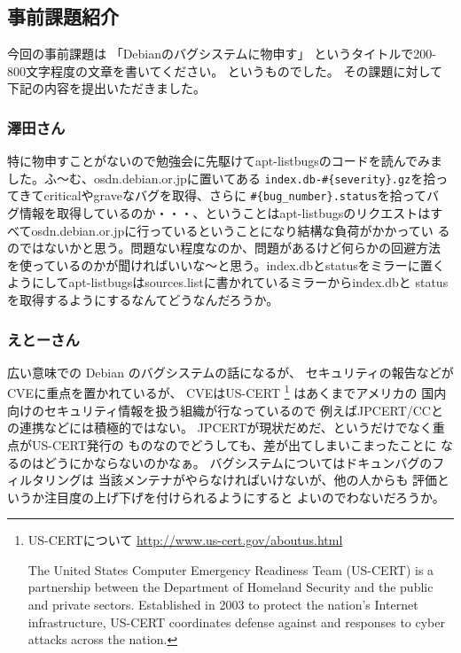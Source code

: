\documentclass[mingoth,a4paper]{jsarticle}
\begin{document}
\subsection{事前課題紹介}


今回の事前課題は
「Debianのバグシステムに物申す」
というタイトルで200-800文字程度の文章を書いてください。
というものでした。
その課題に対して下記の内容を提出いただきました。

\subsubsection{澤田さん}

特に物申すことがないので勉強会に先駆けてapt-listbugsのコードを読んでみま
した。ふ〜む、osdn.debian.or.jpに置いてある
\verb!index.db-#{severity}.gz!を拾っ
てきてcriticalやgraveなバグを取得、さらに
\verb!#{bug_number}.status!を拾ってバ
グ情報を取得しているのか・・・、ということはapt-listbugsのリクエストはす
べてosdn.debian.or.jpに行っているということになり結構な負荷がかかってい
るのではないかと思う。問題ない程度なのか、問題があるけど何らかの回避方法
を使っているのかが聞ければいいな〜と思う。index.dbとstatusをミラーに置く
ようにしてapt-listbugsはsources.listに書かれているミラーからindex.dbと
statusを取得するようにするなんてどうなんだろうか。

\subsubsection{えとーさん}

広い意味での Debian のバグシステムの話になるが、
セキュリティの報告などがCVEに重点を置かれているが、
CVEはUS-CERT
\footnote{
US-CERTについて
\url{http://www.us-cert.gov/aboutus.html}

The United States Computer Emergency Readiness Team (US-CERT) 
is a partnership between the Department of Homeland Security 
and the public and private sectors. Established in 2003 to protect 
the nation's Internet infrastructure, US-CERT coordinates defense against 
and responses to cyber attacks across the nation.
}
はあくまでアメリカの
国内向けのセキュリティ情報を扱う組織が行なっているので
例えばJPCERT/CCとの連携などには積極的ではない。
JPCERTが現状だめだ、というだけでなく重点がUS-CERT発行の
ものなのでどうしても、差が出てしまいこまったことに
なるのはどうにかならないのかなぁ。
バグシステムについてはドキュンバグのフィルタリングは
当該メンテナがやらなければいけないが、他の人からも
評価というか注目度の上げ下げを付けられるようにすると
よいのでわないだろうか。
\end{document}
